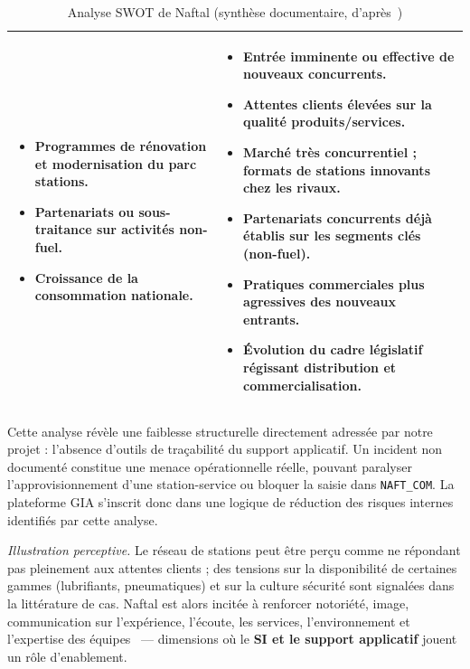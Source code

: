 \begin{table}[H]
\begin{tabularx}{\textwidth}{@{}XX@{}}
\begin{minipage}[t]{\linewidth}
\begin{itemize}
    \item Programmes de rénovation et modernisation du parc stations.
    \item Partenariats ou sous-traitance sur activités non-fuel.
    \item Croissance de la consommation nationale.
\end{itemize}
\end{minipage}
&
\begin{minipage}[t]{\linewidth}
\vspace{0pt}
\begin{itemize}
    \item Entrée imminente ou effective de nouveaux concurrents.
    \item Attentes clients élevées sur la qualité produits/services.
    \item Marché très concurrentiel ; formats de stations innovants chez les rivaux.
    \item Partenariats concurrents déjà établis sur les segments clés (non-fuel).
    \item Pratiques commerciales plus agressives des nouveaux entrants.
    \item Évolution du cadre législatif régissant distribution et commercialisation.
\end{itemize}
\end{minipage}
\\
\bottomrule
\end{tabularx}
\caption{Analyse SWOT de Naftal (synthèse documentaire, d'après~\cite{meghari2014})}
\label{tab:swot}
\end{table}

Cette analyse révèle une faiblesse structurelle directement adressée par notre projet : l'absence
d'outils de traçabilité du support applicatif. Un incident non documenté constitue une menace
opérationnelle réelle, pouvant paralyser l'approvisionnement d'une station-service ou bloquer la
saisie dans \texttt{NAFT\_COM}. La plateforme GIA s'inscrit donc dans une logique de réduction des
risques internes identifiés par cette analyse.

\noindent\textit{Illustration perceptive.} Le réseau de stations peut être perçu comme ne répondant
pas pleinement aux attentes clients ; des tensions sur la disponibilité de certaines gammes
(lubrifiants, pneumatiques) et sur la culture sécurité sont signalées dans la littérature de cas.
Naftal est alors incitée à renforcer notoriété, image, communication sur l'expérience, l'écoute,
les services, l'environnement et l'expertise des équipes~\cite{meghari2014} — dimensions où le
\textbf{SI et le support applicatif} jouent un rôle d'enablement.

